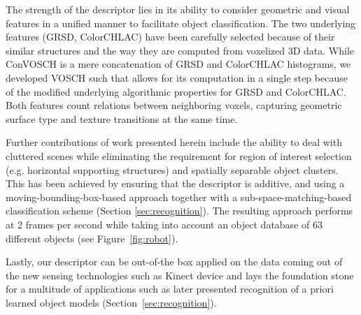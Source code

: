 \documentclass[conference]{sty/IEEEtran}
\begin{document}

The strength of the descriptor lies in its ability to consider geometric and
visual features in a unified manner to facilitate object classification. The two
underlying features (GRSD, ColorCHLAC) have been carefully selected because of 
their similar structures and the way they are computed from voxelized 3D data. 
While ConVOSCH is a mere concatenation of GRSD and ColorCHLAC histograms, we 
developed VOSCH such that allows for its computation in a single step because 
of the modified underlying algorithmic properties for GRSD and ColorCHLAC. 
Both features count relations between neighboring voxels, capturing geometric 
surface type and texture transitions at the same time.

Further contributions of work presented herein include the ability to deal with
cluttered scenes while eliminating the requirement for region of interest
selection (e.g. horizontal supporting structures) and spatially separable object
clusters. This has been achieved by ensuring that the descriptor is additive, and using a
moving-bounding-box-based approach together with a sub-space-matching-based classification scheme (Section
\ref{sec:recognition}). The resulting approach performs at 2 frames per second
while taking into account an object database of 63 different objects
(see Figure~\ref{fig:robot}).




Lastly, our descriptor can be out-of-the box applied on the data coming out of the 
new sensing technologies such as Kinect device and lays the foundation stone for a
multitude of applications such as later presented recognition of a priori learned object models
(Section~\ref{sec:recognition}).
\end{document}
